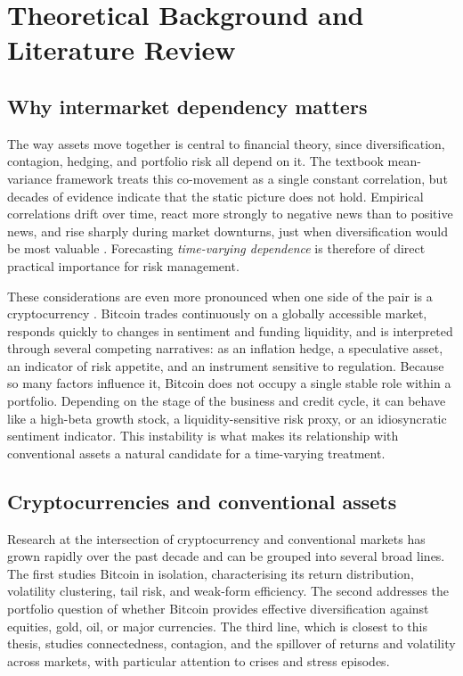 \section{Theoretical Background and Literature Review}

\subsection{Why intermarket dependency matters}

The way assets move together is central to financial theory, since diversification, contagion, hedging, and portfolio risk all depend on it. The textbook mean-variance framework treats this co-movement as a single constant correlation, but decades of evidence indicate that the static picture does not hold. Empirical correlations drift over time, react more strongly to negative news than to positive news, and rise sharply during market downturns, just when diversification would be most valuable \cite{longin2001}. Forecasting \emph{time-varying dependence} is therefore of direct practical importance for risk management.

These considerations are even more pronounced when one side of the pair is a cryptocurrency \cite{nakamoto2008bitcoin}. Bitcoin trades continuously on a globally accessible market, responds quickly to changes in sentiment and funding liquidity, and is interpreted through several competing narratives: as an inflation hedge, a speculative asset, an indicator of risk appetite, and an instrument sensitive to regulation. Because so many factors influence it, Bitcoin does not occupy a single stable role within a portfolio. Depending on the stage of the business and credit cycle, it can behave like a high-beta growth stock, a liquidity-sensitive risk proxy, or an idiosyncratic sentiment indicator. This instability is what makes its relationship with conventional assets a natural candidate for a time-varying treatment.

\subsection{Cryptocurrencies and conventional assets}

Research at the intersection of cryptocurrency and conventional markets has grown rapidly over the past decade and can be grouped into several broad lines. The first studies Bitcoin in isolation, characterising its return distribution, volatility clustering, tail risk, and weak-form efficiency. The second addresses the portfolio question of whether Bitcoin provides effective diversification against equities, gold, oil, or major currencies. The third line, which is closest to this thesis, studies connectedness, contagion, and the spillover of returns and volatility across markets, with particular attention to crises and stress episodes.

